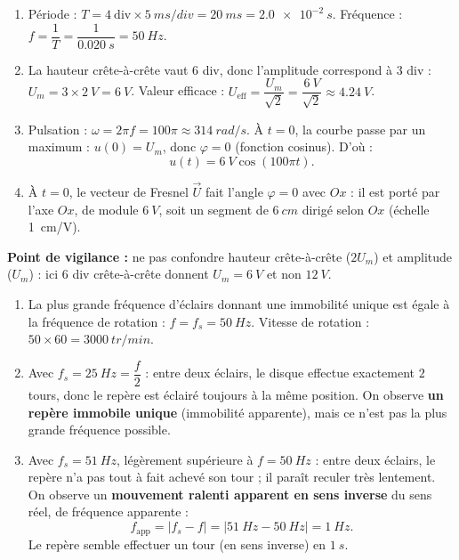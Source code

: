 \documentclass[11pt]{article}
\begin{document}
\begin{corrige}
\begin{enumerate}
\item Période : $T = 4\ \text{div} \times \SI{5}{ms/div} = \SI{20}{ms} = \SI{2,0e-2}{s}$. Fréquence : $f = \dfrac{1}{T} = \dfrac{1}{\SI{0,020}{s}} = \SI{50}{Hz}$.
\item La hauteur crête-à-crête vaut $6$ div, donc l'amplitude correspond à $3$ div : $U_m = 3 \times \SI{2}{V} = \SI{6}{V}$. Valeur efficace : $U_{\text{eff}} = \dfrac{U_m}{\sqrt{2}} = \dfrac{\SI{6}{V}}{\sqrt{2}} \approx \SI{4,24}{V}$.
\item Pulsation : $\omega = 2\pi f = 100\pi \approx \SI{314}{rad/s}$. À $t=0$, la courbe passe par un maximum : $u(0) = U_m$, donc $\varphi = 0$ (fonction cosinus). D'où :
\[ u(t) = \SI{6}{V}\cos(100\pi t). \]
\item À $t = 0$, le vecteur de Fresnel $\vec{U}$ fait l'angle $\varphi = 0$ avec $Ox$ : il est porté par l'axe $Ox$, de module $\SI{6}{V}$, soit un segment de $\SI{6}{cm}$ dirigé selon $Ox$ (échelle \SI{1}{cm/V}).
\end{enumerate}
\textbf{Point de vigilance :} ne pas confondre hauteur crête-à-crête ($2U_m$) et amplitude ($U_m$) : ici $6$ div crête-à-crête donnent $U_m = \SI{6}{V}$ et non $\SI{12}{V}$.
\end{corrige}

\begin{corrige}
\begin{enumerate}
\item La plus grande fréquence d'éclairs donnant une immobilité unique est égale à la fréquence de rotation : $f = f_s = \SI{50}{Hz}$. Vitesse de rotation : $50 \times 60 = \SI{3000}{tr/min}$.
\item Avec $f_s = \SI{25}{Hz} = \dfrac{f}{2}$ : entre deux éclairs, le disque effectue exactement $2$ tours, donc le repère est éclairé toujours à la même position. On observe \textbf{un repère immobile unique} (immobilité apparente), mais ce n'est pas la plus grande fréquence possible.
\item Avec $f_s = \SI{51}{Hz}$, légèrement supérieure à $f = \SI{50}{Hz}$ : entre deux éclairs, le repère n'a pas tout à fait achevé son tour ; il paraît reculer très lentement. On observe un \textbf{mouvement ralenti apparent en sens inverse} du sens réel, de fréquence apparente :
\[ f_{\text{app}} = |f_s - f| = |\SI{51}{Hz} - \SI{50}{Hz}| = \SI{1}{Hz}. \]
Le repère semble effectuer un tour (en sens inverse) en $\SI{1}{s}$.
\end{enumerate}
\end{corrige}
\end{document}
